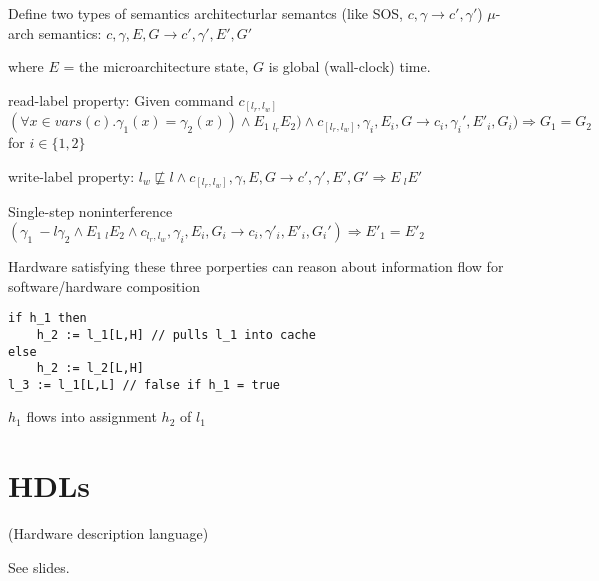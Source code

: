 \documentclass{article}
\begin{document}
Define two types of semantics
architecturlar semantcs (like SOS, $c,\gamma \longrightarrow c',\gamma'$)
$\mu$-arch semantics: $c,\gamma,E,G \longrightarrow c',\gamma',E',G'$

where $E$ =  the microarchitecture state, $G$ is global (wall-clock) time.
 
read-label property: Given command $c_[l_r,l_w]$
$(\forall x \in vars(c) . \gamma_1(x) = \gamma_2(x)) \land E_1 ~_{l_r} E_2) \land c_[l_r,l_w],\gamma_i,E_i,G \longrightarrow c_i,\gamma_i',E'_i,G_i)  \Rightarrow G_1 = G_2$ for $i \in 
\{1,2\}$

write-label property: $l_w \not\sqsubseteq l \land c_{[l_r,l_w]}, \gamma,E,G \longrightarrow c', \gamma',E',G' \Rightarrow E ~_l E' $

Single-step noninterference
$(\gamma_1 ~-l \gamma_2 \land E_1 ~_l E_2 \land c_{l_r,l_w},\gamma_i,E_i,G_i \longrightarrow c_i,\gamma'_i,E'_i,G_i') \Rightarrow E'_1 = E'_2$

Hardware satisfying these three porperties can reason about information flow for software/hardware composition

\begin{lstlisting}[mathescape]
if h_1 then
    h_2 := l_1[L,H] // pulls l_1 into cache
else 
    h_2 := l_2[L,H]
l_3 := l_1[L,L] // false if h_1 = true
\end{lstlisting}
$h_1$ flows into assignment $h_2$ of $l_1$

\section{HDLs}
(Hardware description language)

See slides.
\end{document}

